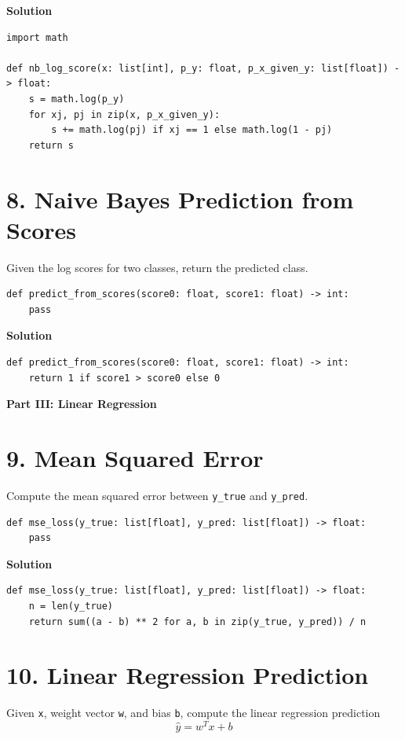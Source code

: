 \documentclass[11pt]{article}
\begin{document}
\medskip
\noindent\textbf{Solution}
\begin{lstlisting}
import math

def nb_log_score(x: list[int], p_y: float, p_x_given_y: list[float]) -> float:
    s = math.log(p_y)
    for xj, pj in zip(x, p_x_given_y):
        s += math.log(pj) if xj == 1 else math.log(1 - pj)
    return s
\end{lstlisting}

\section*{8. Naive Bayes Prediction from Scores}
Given the log scores for two classes, return the predicted class.

\begin{lstlisting}
def predict_from_scores(score0: float, score1: float) -> int:
    pass
\end{lstlisting}

\medskip
\noindent\textbf{Solution}
\begin{lstlisting}
def predict_from_scores(score0: float, score1: float) -> int:
    return 1 if score1 > score0 else 0
\end{lstlisting}

\vspace{0.75em}
\noindent\textbf{\large Part III: Linear Regression}
\vspace{0.5em}

\section*{9. Mean Squared Error}
Compute the mean squared error between \texttt{y\_true} and \texttt{y\_pred}.

\begin{lstlisting}
def mse_loss(y_true: list[float], y_pred: list[float]) -> float:
    pass
\end{lstlisting}

\medskip
\noindent\textbf{Solution}
\begin{lstlisting}
def mse_loss(y_true: list[float], y_pred: list[float]) -> float:
    n = len(y_true)
    return sum((a - b) ** 2 for a, b in zip(y_true, y_pred)) / n
\end{lstlisting}

\section*{10. Linear Regression Prediction}
Given \texttt{x}, weight vector \texttt{w}, and bias \texttt{b}, compute the linear regression prediction
\[
\hat{y} = w^T x + b
\]
\end{document}
